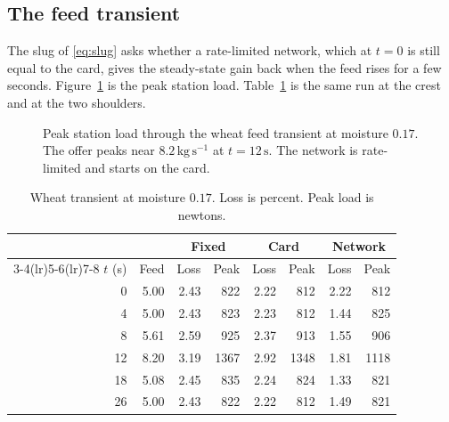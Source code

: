 \subsection{The feed transient}

The slug of \eqref{eq:slug} asks whether a rate-limited network, which at \(t=0\) is still equal to the card, gives the steady-state gain back when the feed rises for a few seconds. Figure~\ref{fig:slug} is the peak station load. Table~\ref{tab:slug} is the same run at the crest and at the two shoulders.

\begin{figure}[ht]
\centering
{}
\caption{Peak station load through the wheat feed transient at moisture \(0.17\). The offer peaks near \(8.2\,\mathrm{kg\,s^{-1}}\) at \(t=12\,\mathrm{s}\). The network is rate-limited and starts on the card.}
\label{fig:slug}
\end{figure}

\begin{table}[ht]
\centering
\caption{Wheat transient at moisture \(0.17\). Loss is percent. Peak load is newtons.}
\label{tab:slug}
\begin{tabular}{@{}rrrrrrrr@{}}
\toprule
& & \multicolumn{2}{c}{Fixed} & \multicolumn{2}{c}{Card} & \multicolumn{2}{c}{Network} \\
\cmidrule(lr){3-4}\cmidrule(lr){5-6}\cmidrule(lr){7-8}
\(t\) (s) & Feed & Loss & Peak & Loss & Peak & Loss & Peak \\
\midrule
0 & 5.00 & 2.43 & 822 & 2.22 & 812 & 2.22 & 812 \\
4 & 5.00 & 2.43 & 823 & 2.23 & 812 & 1.44 & 825 \\
8 & 5.61 & 2.59 & 925 & 2.37 & 913 & 1.55 & 906 \\
12 & 8.20 & 3.19 & 1367 & 2.92 & 1348 & 1.81 & 1118 \\
18 & 5.08 & 2.45 & 835 & 2.24 & 824 & 1.33 & 821 \\
26 & 5.00 & 2.43 & 822 & 2.22 & 812 & 1.49 & 821 \\
\bottomrule
\end{tabular}
\end{table}

